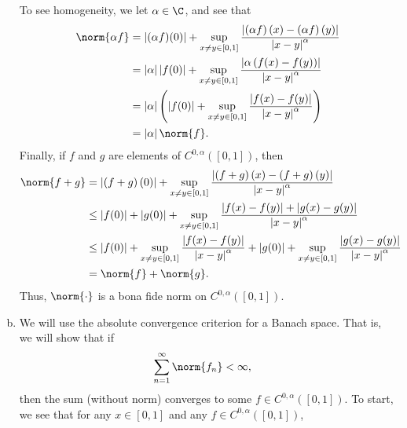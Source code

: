 \documentclass[10pt]{mypackage}
\begin{document}
\begin{enumerate}[(a)]
    To see homogeneity, we let $\alpha\in \C$, and see that
    \begin{align*}
      \norm{\alpha f} &= \left\vert (\alpha f)(0) \right\vert + \sup_{x\neq y\in [0,1]} \frac{\left\vert \left( \alpha f \right)(x) - \left( \alpha f \right)(y) \right\vert}{\left\vert x-y \right\vert^{\alpha}}\\
                      &= \left\vert \alpha \right\vert\left\vert f(0) \right\vert + \sup_{x\neq y\in [0,1]} \frac{\left\vert \alpha \left( f(x)-f(y) \right) \right\vert}{\left\vert x-y \right\vert^{\alpha}}\\
                      &= \left\vert \alpha \right\vert \left( \left\vert f(0) \right\vert + \sup_{x\neq y\in [0,1]} \frac{\left\vert f(x)-f(y) \right\vert}{\left\vert x-y \right\vert^{\alpha}} \right)\\
                      &= \left\vert \alpha \right\vert\norm{f}.
    \end{align*}
    Finally, if $f$ and $g$ are elements of $C^{0,\alpha}\left( [0,1] \right)$, then
    \begin{align*}
      \norm{f+g} &= \left\vert \left( f+g \right)(0) \right\vert + \sup_{x\neq y\in [0,1]} \frac{\left\vert \left( f+g \right)(x) - \left( f+g \right)(y) \right\vert}{\left\vert x-y \right\vert^{\alpha}}\\
                 &\leq \left\vert f(0) \right\vert + \left\vert g(0) \right\vert + \sup_{x\neq y\in [0,1]} \frac{\left\vert f(x)-f(y) \right\vert + \left\vert g(x)-g(y) \right\vert}{\left\vert x-y \right\vert^{\alpha}}\\
                 &\leq \left\vert f(0) \right\vert + \sup_{x\neq y\in [0,1]} \frac{\left\vert f(x)-f(y) \right\vert}{\left\vert x-y \right\vert^{\alpha}} + \left\vert g(0) \right\vert + \sup_{x\neq y\in [0,1]} \frac{\left\vert g(x)-g(y) \right\vert}{\left\vert x-y \right\vert^{\alpha}}\\
                 &= \norm{f} + \norm{g}.
    \end{align*}
    Thus, $\norm{\cdot}$ is a bona fide norm on $C^{0,\alpha}\left( \left[ 0,1 \right] \right)$.
  \item We will use the absolute convergence criterion for a Banach space. That is, we will show that if
    \begin{align*}
      \sum_{n=1}^{\infty}\norm{f_n} &< \infty,
    \end{align*}
    then the sum (without norm) converges to some $f\in C^{0,\alpha}\left( [0,1] \right)$. To start, we see that for any $x\in [0,1]$ and any $f\in C^{0,\alpha}\left( [0,1] \right)$,

\end{enumerate}
\end{document}
